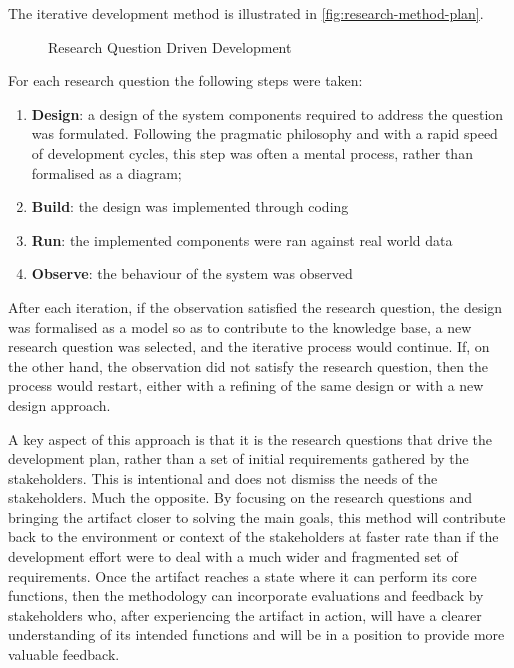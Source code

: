 The iterative development method is illustrated in \autoref{fig:research-method-plan}.

\begin{figure}[h]
    \centering
    
    \caption[Research Question Driven Development]{Research Question Driven Development}
    \label{fig:research-method-plan}
\end{figure}

For each research question the following steps were taken:

\begin{enumerate}
    \item \textbf{Design}: a design of the system components required to address the question was formulated. Following the pragmatic philosophy and with a rapid speed of development cycles, this step was often a mental process, rather than formalised as a diagram;
    \item  \textbf{Build}: the design was implemented through coding
    \item  \textbf{Run}: the implemented components were ran against real world data
    \item  \textbf{Observe}: the behaviour of the system was observed
\end{enumerate}

After each iteration, if the observation satisfied the research question, the design was formalised as a model so as to contribute to the knowledge base, a new research question was selected, and the iterative process would continue. If, on the other hand, the observation did not satisfy the research question, then the process would restart, either with a refining of the same design or with a new design approach.

A key aspect of this approach is that it is the research questions that drive the development plan, rather than a set of initial requirements gathered by the stakeholders. This is intentional and does not dismiss the needs of the stakeholders. Much the opposite. By focusing on the research questions and bringing the artifact closer to solving the main goals, this method will contribute back to the environment or context of the stakeholders at faster rate than if the development effort were to deal with a much wider and fragmented set of requirements. Once the artifact reaches a state where it can perform its core functions, then the methodology can incorporate evaluations and feedback by stakeholders who, after experiencing the artifact in action, will have a clearer understanding of its intended functions and will be in a position to provide more valuable feedback.

